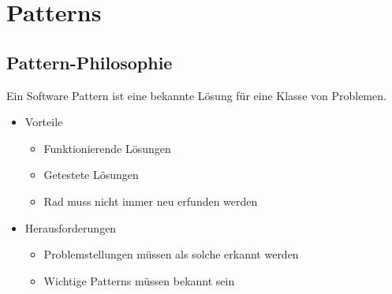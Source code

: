 \section{Patterns}

\subsection{Pattern-Philosophie}
Ein Software Pattern ist eine bekannte Lösung für eine Klasse von Problemen. 

\begin{itemize}
\item Vorteile
	\begin{itemize}
	\item Funktionierende Lösungen
	\item Getestete Lösungen
	\item Rad muss nicht immer neu erfunden werden
	\end{itemize}
\item Herausforderungen
	\begin{itemize}
	\item Problemstellungen müssen als solche erkannt werden
	\item Wichtige Patterns müssen bekannt sein
	\end{itemize}
\end{itemize}

